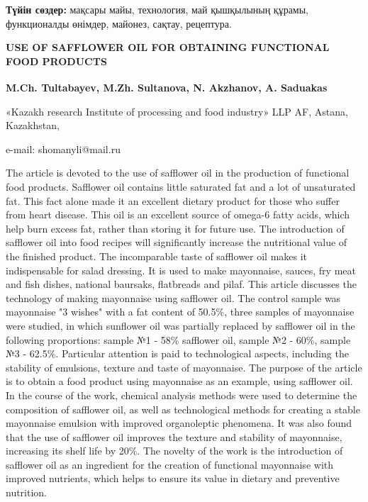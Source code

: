 {\bfseries Түйін сөздер:} мақсары майы, технология, май қышқылының құрамы,
функционалды өнімдер, майонез, сақтау, рецептура.

\begin{articleheader}
{\bfseries USE OF SAFFLOWER OIL FOR OBTAINING FUNCTIONAL FOOD PRODUCTS}

{\bfseries
M.Ch. Tultabayev\textsuperscript{\envelope },
M.Zh. Sultanova,
N. Akzhanov,
A. Saduakas
}
\end{articleheader}

\begin{affiliation}
«Kazakh research Institute of processing and food industry» LLP AF, Astana, Kazakhstan,

e-mail: shomanyli@mail.ru
\end{affiliation}

The article is devoted to the use of safflower oil in the production of
functional food products. Safflower oil contains little saturated fat
and a lot of unsaturated fat. This fact alone made it an excellent
dietary product for those who suffer from heart disease. This oil is an
excellent source of omega-6 fatty acids, which help burn excess fat,
rather than storing it for future use. The introduction of safflower oil
into food recipes will significantly increase the nutritional value of
the finished product. The incomparable taste of safflower oil makes it
indispensable for salad dressing. It is used to make mayonnaise, sauces,
fry meat and fish dishes, national baursaks, flatbreads and pilaf. This
article discusses the technology of making mayonnaise using safflower
oil. The control sample was mayonnaise "3 wishes" with a fat content of
50.5\%, three samples of mayonnaise were studied, in which sunflower oil
was partially replaced by safflower oil in the following proportions:
sample №1 - 58\% safflower oil, sample №2 - 60\%, sample №3 - 62.5\%.
Particular attention is paid to technological aspects, including the
stability of emulsions, texture and taste of mayonnaise. The purpose of
the article is to obtain a food product using mayonnaise as an example,
using safflower oil. In the course of the work, chemical analysis
methods were used to determine the composition of safflower oil, as well
as technological methods for creating a stable mayonnaise emulsion with
improved organoleptic phenomena. It was also found that the use of
safflower oil improves the texture and stability of mayonnaise,
increasing its shelf life by 20\%. The novelty of the work is the
introduction of safflower oil as an ingredient for the creation of
functional mayonnaise with improved nutrients, which helps to ensure its
value in dietary and preventive nutrition.


